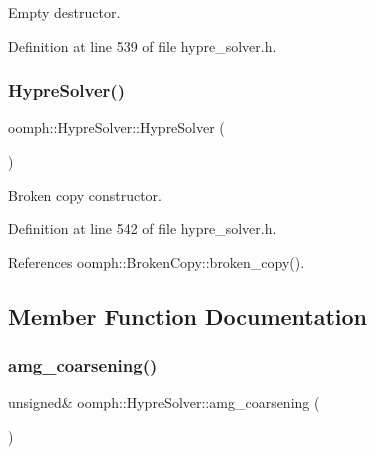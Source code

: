 Empty destructor. 



Definition at line 539 of file hypre\+\_\+solver.\+h.

\mbox{\label{classoomph_1_1HypreSolver_acb24f66623db84815531ccd791107938}} 
\subsubsection{\texorpdfstring{Hypre\+Solver()}{HypreSolver()}\hspace{0.1cm}{\footnotesize\ttfamily [2/2]}}
{\footnotesize\ttfamily oomph\+::\+Hypre\+Solver\+::\+Hypre\+Solver (\begin{DoxyParamCaption}\item[{const \hyperlink{classoomph_1_1HypreSolver}{Hypre\+Solver} \&}]{ }\end{DoxyParamCaption})\hspace{0.3cm}{\ttfamily [inline]}}



Broken copy constructor. 



Definition at line 542 of file hypre\+\_\+solver.\+h.



References oomph\+::\+Broken\+Copy\+::broken\+\_\+copy().



\subsection{Member Function Documentation}
\mbox{\label{classoomph_1_1HypreSolver_a5ed32fd8b3540cd863c30a76da15b0cb}} 
\subsubsection{\texorpdfstring{amg\+\_\+coarsening()}{amg\_coarsening()}}
{\footnotesize\ttfamily unsigned\& oomph\+::\+Hypre\+Solver\+::amg\+\_\+coarsening (\begin{DoxyParamCaption}{ }\end{DoxyParamCaption})\hspace{0.3cm}{\ttfamily [inline]}}



